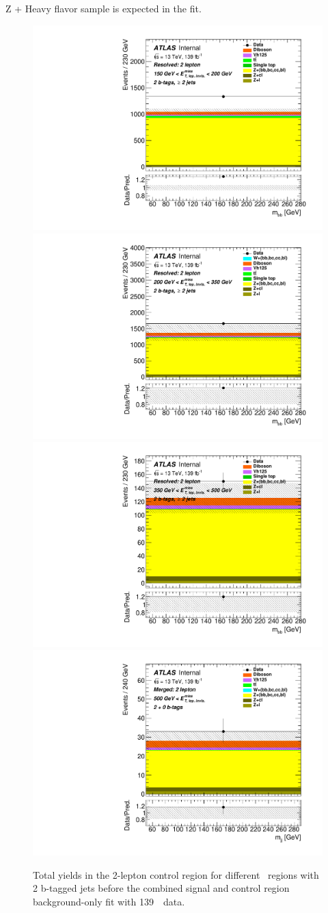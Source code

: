 Z + Heavy flavor sample is expected in the fit.
\begin{figure}[H]
  \includegraphics[width=0.46\linewidth]{chapters/c9/figures/Region_distmBB_J2_L2_T2_DCR2_Y2015_incJet1_Fat0_incFat1_BMin150_BMax200_Prefit.pdf}
  \includegraphics[width=0.46\linewidth]{chapters/c9/figures/Region_distmBB_J2_L2_T2_DCR2_Y2015_incJet1_Fat0_incFat1_BMin200_BMax350_Prefit.pdf}\\
  \includegraphics[width=0.46\linewidth]{chapters/c9/figures/Region_distmBB_J2_L2_T2_DCR2_Y2015_incJet1_Fat0_incFat1_BMin350_BMax500_Prefit.pdf}
  \includegraphics[width=0.46\linewidth]{chapters/c9/figures/Region_BMin500_incFat1_Fat1_incJet1_Y2015_DCR2_T20_L2_distmBB_J0_Prefit.pdf}
\caption{Total yields in the 2-lepton control region for different \met~regions with \\2 b-tagged jets before the combined signal and control region background-only fit with 139~\ifb~data.}
\label{fig:Data_MC_CR2_ll_m_jj_2b}
\end{figure}

